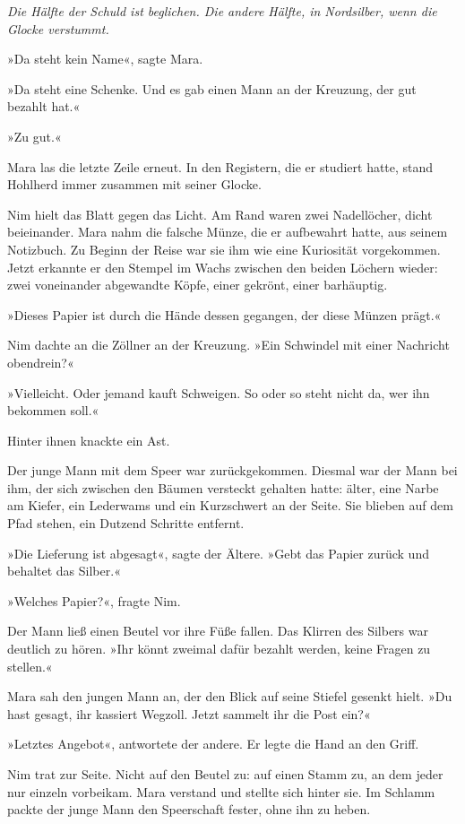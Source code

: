 \documentclass[10pt,a4paper]{article}
\begin{document}
\emph{Die Hälfte der Schuld ist beglichen. Die andere Hälfte, in Nordsilber, wenn die Glocke verstummt.}

»Da steht kein Name«, sagte Mara.

»Da steht eine Schenke. Und es gab einen Mann an der Kreuzung, der gut bezahlt hat.«

»Zu gut.«

Mara las die letzte Zeile erneut. In den Registern, die er studiert hatte, stand Hohlherd immer zusammen mit seiner Glocke.

Nim hielt das Blatt gegen das Licht. Am Rand waren zwei Nadellöcher, dicht beieinander. Mara nahm die falsche Münze, die er aufbewahrt hatte, aus seinem Notizbuch. Zu Beginn der Reise war sie ihm wie eine Kuriosität vorgekommen. Jetzt erkannte er den Stempel im Wachs zwischen den beiden Löchern wieder: zwei voneinander abgewandte Köpfe, einer gekrönt, einer barhäuptig.

»Dieses Papier ist durch die Hände dessen gegangen, der diese Münzen prägt.«

Nim dachte an die Zöllner an der Kreuzung. »Ein Schwindel mit einer Nachricht obendrein?«

»Vielleicht. Oder jemand kauft Schweigen. So oder so steht nicht da, wer ihn bekommen soll.«

Hinter ihnen knackte ein Ast.

Der junge Mann mit dem Speer war zurückgekommen. Diesmal war der Mann bei ihm, der sich zwischen den Bäumen versteckt gehalten hatte: älter, eine Narbe am Kiefer, ein Lederwams und ein Kurzschwert an der Seite. Sie blieben auf dem Pfad stehen, ein Dutzend Schritte entfernt.

»Die Lieferung ist abgesagt«, sagte der Ältere. »Gebt das Papier zurück und behaltet das Silber.«

»Welches Papier?«, fragte Nim.

Der Mann ließ einen Beutel vor ihre Füße fallen. Das Klirren des Silbers war deutlich zu hören. »Ihr könnt zweimal dafür bezahlt werden, keine Fragen zu stellen.«

Mara sah den jungen Mann an, der den Blick auf seine Stiefel gesenkt hielt. »Du hast gesagt, ihr kassiert Wegzoll. Jetzt sammelt ihr die Post ein?«

»Letztes Angebot«, antwortete der andere. Er legte die Hand an den Griff.

Nim trat zur Seite. Nicht auf den Beutel zu: auf einen Stamm zu, an dem jeder nur einzeln vorbeikam. Mara verstand und stellte sich hinter sie. Im Schlamm packte der junge Mann den Speerschaft fester, ohne ihn zu heben.
\end{document}
